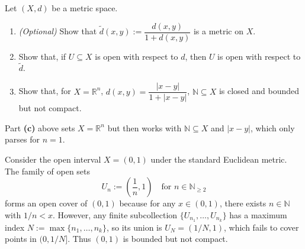 \begin{exercise}
\label{ex:heine_borel_fails}
Let $(X,d)$ be a metric space.
\begin{enumerate}[label=\textbf{(\alph*)}]
  \item \textit{(Optional)} Show that $\tilde d(x,y) := \dfrac{d(x,y)}{1 + d(x,y)}$ is a metric on
    $X$.
  \item Show that, if $U \subseteq X$ is open with respect to $d$, then $U$ is open with respect
    to $\tilde d$.
  \item Show that, for $X = \mathbb{R}^n$, $d(x,y) = \dfrac{|x-y|}{1+|x-y|}$,
    $\mathbb{N} \subseteq X$ is closed and bounded but not compact.
\end{enumerate}
\end{exercise}

\begin{ainote}
Part \textbf{(c)} above sets $X = \mathbb{R}^n$ but then works with $\mathbb{N} \subseteq X$ and $|x-y|$,
which only parses for $n = 1$.
\end{ainote}

\begin{aiexample}
Consider the open interval $X = (0,1)$ under the standard Euclidean metric. The family of open sets
\[
U_n := \left(\frac{1}{n}, 1\right) \quad \text{for } n \in \mathbb{N}_{\ge 2}
\]
forms an open cover of $(0,1)$ because for any $x \in (0,1)$, there exists $n \in \mathbb{N}$ with $1/n < x$. However, any finite subcollection $\{U_{n_1}, \dots, U_{n_k}\}$ has a maximum index $N := \max\{n_1, \dots, n_k\}$, so its union is $U_N = (1/N, 1)$, which fails to cover points in $(0, 1/N]$. Thus $(0,1)$ is bounded but not compact.
\end{aiexample}

